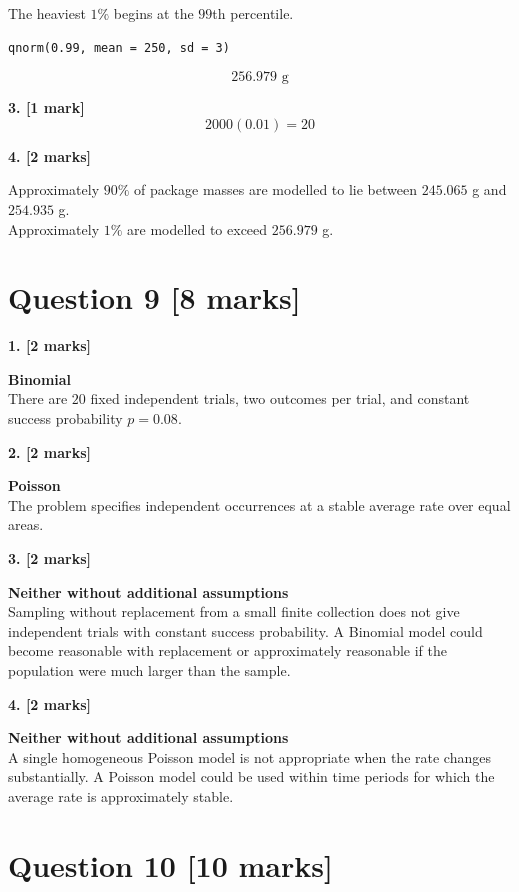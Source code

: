 \documentclass[10pt,letterpaper]{article}
\begin{document}
The heaviest \(1\%\) begins at the \(99\)th percentile.

\begin{lstlisting}
qnorm(0.99, mean = 250, sd = 3)
\end{lstlisting}
$$\boxed{256.979\text{ g}}$$

\textbf{3. [1 mark]}
$$2000(0.01)=\boxed{20}$$

\textbf{4. [2 marks]}

Approximately \(90\%\) of package masses are modelled to lie between \(245.065\) g and \(254.935\) g. \\
Approximately \(1\%\) are modelled to exceed \(256.979\) g.

\section*{Question 9 \hfill [8 marks]}

\textbf{1. [2 marks]}

\textbf{Binomial}\\
There are \(20\) fixed independent trials, two outcomes per trial, and constant success probability \(p=0.08\).

\textbf{2. [2 marks]}

\textbf{Poisson}\\
The problem specifies independent occurrences at a stable average rate over equal areas.

\textbf{3. [2 marks]}

\textbf{Neither without additional assumptions}\\
Sampling without replacement from a small finite collection does not give independent trials with constant success probability. A Binomial model could become reasonable with replacement or approximately reasonable if the population were much larger than the sample.

\textbf{4. [2 marks]}

\textbf{Neither without additional assumptions}\\
A single homogeneous Poisson model is not appropriate when the rate changes substantially. A Poisson model could be used within time periods for which the average rate is approximately stable.

\section*{Question 10 \hfill [10 marks]}
\end{document}
